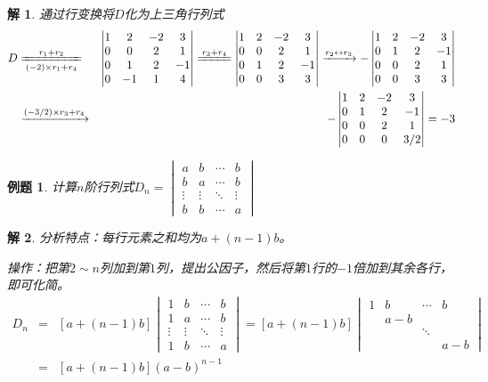\documentclass[a4paper]{book}
\newtheorem{eg}{例题}[chapter]
\newtheorem*{solution}{解}
\begin{document}
\begin{solution}
通过行变换将$D$化为上三角行列式
\begin{eqnarray*}
D & \xlongequal[(-2)\times r_1 + r_4]{r_1 + r_2} & \begin{vmatrix} 1 & 2 & -2 & 3 \\ 0 & 0 & 2 & 1 \\ 0 & 1 & 2 & -1 \\ 0 & -1 & 1 & 4 \end{vmatrix} \xlongequal{r_3 + r_4} \begin{vmatrix} 1 & 2 & -2 & 3 \\ 0 & 0 & 2 & 1 \\ 0 & 1 & 2 & -1 \\ 0 & 0 & 3 & 3 \end{vmatrix} \xrightarrow{r_2 \leftrightarrow r_3} -\begin{vmatrix} 1 & 2 & -2 & 3 \\ 0 & 1 & 2 & -1 \\ 0 & 0 & 2 & 1 \\ 0 & 0 & 3 & 3 \end{vmatrix} \\
& \xrightarrow{(-3/2)\times r_3 + r_4} & -\begin{vmatrix} 1 & 2 & -2 & 3 \\ 0 & 1 & 2 & -1 \\ 0 & 0 & 2 & 1 \\ 0 & 0 & 0 & 3/2 \end{vmatrix} = -3
\end{eqnarray*}
\end{solution}

\begin{eg}
计算$n$阶行列式$D_n = \begin{vmatrix}
a & b & \cdots & b \\ b & a & \cdots & b \\ \vdots & \vdots & \ddots & \vdots \\ b & b & \cdots & a \end{vmatrix}$
\end{eg}

\begin{solution}
分析特点：每行元素之和均为$a+(n-1)b$。

操作：把第$2\sim n$列加到第$1$列，提出公因子，然后将第$1$行的$-1$倍加到其余各行，即可化简。
\begin{eqnarray*}
D_n & = & [a+(n-1)b] \begin{vmatrix} 1 & b & \cdots & b \\ 1 & a & \cdots & b \\ \vdots & \vdots & \ddots & \vdots \\ 1 & b & \cdots & a \end{vmatrix} = [a+(n-1)b] \begin{vmatrix} 1 & b & \cdots & b \\ & a-b & & \\ & & \ddots & \\ & & & a-b \end{vmatrix} \\
& = & [a+(n-1)b](a-b)^{n-1}
\end{eqnarray*}
\end{solution}
\end{document}
